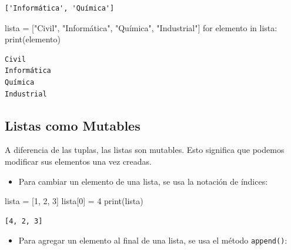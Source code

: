 \documentclass[
  letterpaper,
  DIV=11,
  numbers=noendperiod]{scrreprt}
\newenvironment{Shaded}{\begin{snugshade}}{\end{snugshade}}
\newcommand{\BuiltInTok}[1]{\textcolor[rgb]{0.00,0.23,0.31}{#1}}
\newcommand{\ControlFlowTok}[1]{\textcolor[rgb]{0.00,0.23,0.31}{#1}}
\newcommand{\DecValTok}[1]{\textcolor[rgb]{0.68,0.00,0.00}{#1}}
\newcommand{\KeywordTok}[1]{\textcolor[rgb]{0.00,0.23,0.31}{#1}}
\newcommand{\NormalTok}[1]{\textcolor[rgb]{0.00,0.23,0.31}{#1}}
\newcommand{\OperatorTok}[1]{\textcolor[rgb]{0.37,0.37,0.37}{#1}}
\newcommand{\StringTok}[1]{\textcolor[rgb]{0.13,0.47,0.30}{#1}}
\providecommand{\tightlist}{%
  \setlength{\itemsep}{0pt}\setlength{\parskip}{0pt}}\usepackage{longtable,booktabs,array}
\begin{document}
\begin{verbatim}
['Informática', 'Química']
\end{verbatim}

\begin{Shaded}
\begin{Highlighting}[]
\NormalTok{lista }\OperatorTok{=}\NormalTok{ [}\StringTok{"Civil"}\NormalTok{, }\StringTok{"Informática"}\NormalTok{, }\StringTok{"Química"}\NormalTok{, }\StringTok{"Industrial"}\NormalTok{]}
\ControlFlowTok{for}\NormalTok{ elemento }\KeywordTok{in}\NormalTok{ lista:}
    \BuiltInTok{print}\NormalTok{(elemento)}
\end{Highlighting}
\end{Shaded}

\begin{verbatim}
Civil
Informática
Química
Industrial
\end{verbatim}

\subsection{Listas como Mutables}\label{listas-como-mutables}

A diferencia de las tuplas, las listas son mutables. Esto significa que
podemos modificar sus elementos una vez creadas.

\begin{itemize}
\tightlist
\item
  Para cambiar un elemento de una lista, se usa la notación de índices:
\end{itemize}

\begin{Shaded}
\begin{Highlighting}[]
\NormalTok{lista }\OperatorTok{=}\NormalTok{ [}\DecValTok{1}\NormalTok{, }\DecValTok{2}\NormalTok{, }\DecValTok{3}\NormalTok{]}
\NormalTok{lista[}\DecValTok{0}\NormalTok{] }\OperatorTok{=} \DecValTok{4}
\BuiltInTok{print}\NormalTok{(lista)}
\end{Highlighting}
\end{Shaded}

\begin{verbatim}
[4, 2, 3]
\end{verbatim}

\begin{itemize}
\tightlist
\item
  Para agregar un elemento al final de una lista, se usa el método
  \texttt{append()}:
\end{itemize}
\end{document}
